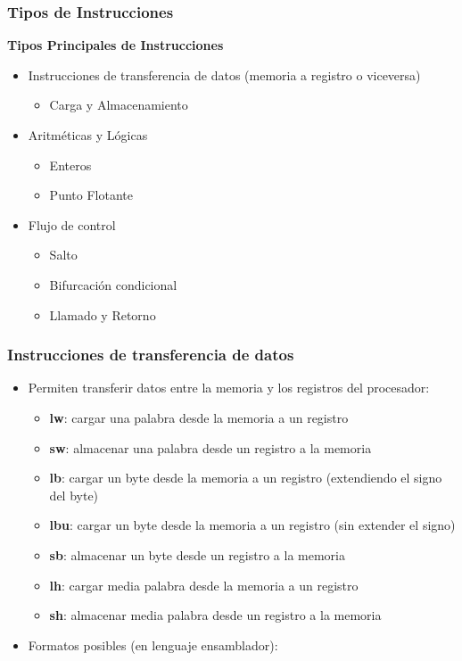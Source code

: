 \documentclass[aspectratio=169,compress]{beamer}
\begin{document}
\begin{footnotesize}
\begin{frame}
\frametitle{Tipos de Instrucciones}
\begin{center}\textbf{Tipos Principales de Instrucciones}\end{center}
\begin{itemize}
\item Instrucciones de transferencia de datos (memoria a registro o viceversa)
\begin{itemize}
\item Carga y Almacenamiento
\end{itemize}
\item Aritméticas y Lógicas
\begin{itemize}
\item Enteros
\item Punto Flotante
\end{itemize}
\item Flujo de control
\begin{itemize}
\item Salto
\item Bifurcación condicional
\item Llamado y Retorno
\end{itemize}
\end{itemize}
\end{frame}


\begin{frame}
\frametitle{Instrucciones de transferencia de datos}
\begin{itemize}
\item Permiten transferir datos entre la memoria y los registros del procesador:
\bigskip
\begin{itemize}
\item \textbf{lw}: cargar una palabra desde la memoria a un registro
\item \textbf{sw}: almacenar una palabra desde un registro a la memoria
\item \textbf{lb}: cargar un byte desde la memoria a un registro (extendiendo el signo del byte)
\item \textbf{lbu}: cargar un byte desde la memoria a un registro (sin extender el signo)
\item \textbf{sb}: almacenar un byte desde un registro a la memoria
\item \textbf{lh}: cargar media palabra desde la memoria a un registro
\item \textbf{sh}: almacenar media palabra desde un registro a la memoria
\end{itemize}
\bigskip
\item Formatos posibles (en lenguaje ensamblador):


\end{itemize}
\end{frame}
\end{footnotesize}
\end{document}

